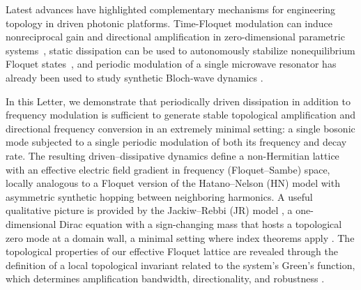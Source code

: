 \documentclass[prl,twocolumn,floatfix,10pt,superscriptaddress]{revtex4-2}
\begin{document}
Latest advances have highlighted complementary mechanisms for engineering topology in driven photonic platforms. Time-Floquet modulation can induce nonreciprocal gain and directional amplification in zero-dimensional parametric systems~\cite{Koutserimpas2018}, static dissipation can be used to autonomously stabilize nonequilibrium Floquet states~\cite{Ritter2024}, and periodic modulation of a single microwave resonator has already been used to study synthetic Bloch-wave dynamics \cite{Ahrens2025}. 

In this Letter, we demonstrate that periodically driven dissipation in addition to frequency modulation is sufficient to generate stable topological amplification and directional frequency conversion in an extremely minimal setting: a single bosonic mode subjected to a single periodic modulation of both its frequency and decay rate. The resulting driven–dissipative dynamics define a non-Hermitian lattice with an effective electric field gradient in frequency (Floquet–Sambe) space, locally analogous to a Floquet version of the Hatano–Nelson (HN) model \cite{Hatano1996} with asymmetric synthetic hopping between neighboring harmonics. A useful qualitative picture is provided by the Jackiw–Rebbi (JR) model \cite{Jackiw1976}, a one-dimensional Dirac equation with a sign-changing mass that hosts a topological zero mode at a domain wall, a minimal setting where index theorems apply \cite{AtiyahSinger1963,Callias1978}. The topological properties of our effective Floquet lattice are revealed through the definition of a local topological invariant related to the system’s Green’s function, which determines amplification bandwidth, directionality, and robustness \cite{yao2017topological,Yao2018}.
\end{document}
